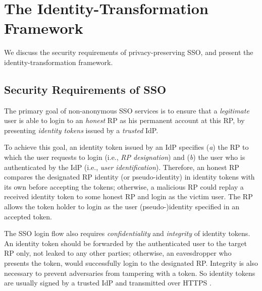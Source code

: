 \section{The Identity-Transformation Framework}
\label{sec:challenge}

We discuss the security requirements of privacy-preserving SSO,
 and present the identity-transformation framework.


\subsection{Security Requirements of SSO}
\label{subsec:basicrequirements}

The primary goal of non-anonymous SSO services \cite{OpenIDConnect,rfc6749,SAML,SAMLIdentifier,NIST2017draft} is %
 to ensure that a \emph{legitimate} user is able to login to an \emph{honest} RP as his permanent account at this RP, %
    by presenting \emph{identity tokens} issued by a \emph{trusted} IdP.

To achieve this goal,
 an identity token issued by an IdP \cite{OpenIDConnect,rfc6749,SAML,SAMLIdentifier,NIST2017draft} specifies (\emph{a}) the RP to which the user requests to login (i.e., \emph{RP designation})
    and  (\emph{b}) the user who is authenticated by the IdP (i.e., \emph{user identification}).
Therefore,
    an honest RP compares the designated RP identity (or pseudo-identity) in identity tokens with its own before accepting the tokens;
     otherwise,
        a malicious RP could replay a received identity token to some honest RP and login as the victim user.
The RP allows the token holder to login as the user (pseudo-)identity specified in an accepted token.

The SSO login flow also requires \emph{confidentiality} and \emph{integrity} of identity tokens.
An identity token should be forwarded by the authenticated user to the target RP only,
    not leaked to any other parties;
        otherwise, an eavesdropper who presents the token, would successfully login to the designated RP.
Integrity is also necessary
    to prevent adversaries from tampering with a token.
So identity tokens are usually signed by a trusted IdP and transmitted over HTTPS \cite{OpenIDConnect,rfc6749,SAML}.

